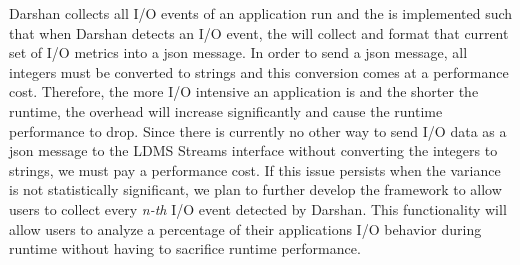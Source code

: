 Darshan collects all I/O events of an application run and the \connector{} is implemented such that when Darshan detects an I/O event, the \connector{} will collect and format that current set of I/O metrics into a json message. In order to send a json message, all integers must be converted to strings and this conversion comes at a performance cost. Therefore, the more I/O intensive an application is and the shorter the runtime, the overhead will increase significantly and cause the runtime performance to drop. Since there is currently no other way to send I/O data as a json message to the LDMS Streams interface without converting the integers to strings, we must pay a performance cost. If this issue persists when the variance is not statistically significant, we plan to further develop the \Darshan{} framework to allow users to collect every \emph{n-th} I/O event detected by Darshan. This functionality will allow users to analyze a percentage of their applications I/O behavior during runtime without having to sacrifice runtime performance.




